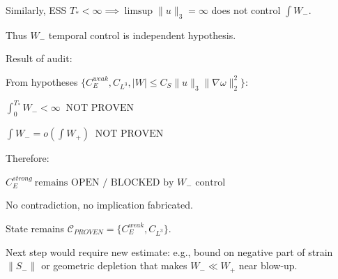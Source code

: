\documentclass[11pt]{article}
\begin{document}
Similarly, ESS $T_*<\infty\implies\limsup\|u\|_3=\infty$ does not control $\int W_-$.

Thus $W_-$ temporal control is independent hypothesis.

Result of audit:

From hypotheses $\{C_E^{weak},C_{L^3}, |W|\le C_S\|u\|_3\|\nabla\omega\|_2^2\}$:

$\boxed{\int_0^{T_*}W_-<\infty\ \text{ NOT PROVEN}}$

$\boxed{\int W_- = o(\int W_+)\ \text{ NOT PROVEN}}$

Therefore:

$\boxed{C_E^{strong}\ \text{remains OPEN / BLOCKED by }W_-\text{ control}}$

No contradiction, no implication fabricated.

State remains $\mathcal{C}_{PROVEN}=\{C_E^{weak},C_{L^3}\}$.

Next step would require new estimate: e.g., bound on negative part of strain $\|S_-\|$ or geometric depletion that makes $W_-\ll W_+$ near blow-up.
\end{document}
